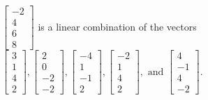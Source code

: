 \begin{exercise}
\begin{exerciseStatement}
  \end{exerciseStatement}
  \begin{exerciseAnswer}
   \(\left[\begin{array}{c}
-2 \\
4 \\
6 \\
8
\end{array}\right]\) 
  	 is  
	a linear combination of the vectors \(\left[\begin{array}{c}
3 \\
1 \\
4 \\
2
\end{array}\right] , \left[\begin{array}{c}
2 \\
0 \\
-2 \\
-2
\end{array}\right] , \left[\begin{array}{c}
-4 \\
1 \\
-1 \\
2
\end{array}\right] , \left[\begin{array}{c}
-2 \\
1 \\
4 \\
2
\end{array}\right] , \text{ and } \left[\begin{array}{c}
4 \\
-1 \\
4 \\
-2
\end{array}\right]\).

	
  


  \end{exerciseAnswer}
\end{exercise}